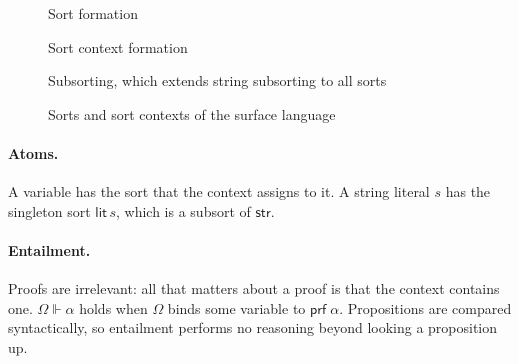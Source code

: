 \documentclass[11pt]{article}
\newcommand{\kw}[1]{\mathsf{#1}}
\newcommand{\str}{\kw{str}}
\newcommand{\lit}[1]{\kw{lit}\,#1}
\newcommand{\prf}[1]{\kw{prf}\;#1}
\newcommand{\pred}[1]{\kw{pred}\;#1}
\newcommand{\emptyctx}{\diamond}
\newcommand{\proves}{\Vdash}
\newcommand{\isprop}{\ \kw{prop}}
\newcommand{\rulename}[1]{\textsc{#1}}
\newcommand{\judgmentbox}[2]{\medskip\noindent\fbox{$#1$}\quad #2\par\vspace{-1.2\baselineskip}}
\theoremstyle{remark}
\begin{document}
\begin{figure}[!htbp]
\judgmentbox{\Omega \vdash q}{Sort formation}

\judgmentbox{\Omega \vdash}{Sort context formation}

\judgmentbox{q \leq q'}{Subsorting, which extends string subsorting to all sorts}
\caption{Sorts and sort contexts of the surface language}
\label{fig:sort-judgments}
\end{figure}

\paragraph{Atoms.} A variable has the sort that the context assigns to it. A string literal $s$
has the singleton sort $\lit{s}$, which is a subsort of $\str$.

\paragraph{Entailment.} Proofs are irrelevant: all that matters about a proof is that the context
contains one. $\Omega \proves \alpha$ holds when $\Omega$ binds some variable to $\prf{\alpha}$.
Propositions are compared syntactically, so entailment performs no reasoning beyond looking a
proposition up.
\end{document}
